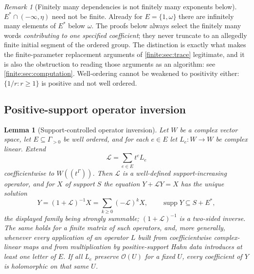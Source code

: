 \documentclass[11pt,letterpaper]{article}
\newtheorem{lemma}[theorem]{Lemma}
\theoremstyle{definition}
\theoremstyle{remark}
\newtheorem{remark}[theorem]{Remark}
\newcommand{\OO}{\mathcal O}
\DeclareMathOperator{\supp}{supp}
\numberwithin{equation}{section}
\begin{document}
\begin{remark}[Finitely many dependencies is not finitely many exponents below]
\label{finite:rem:truncation}
$E^*\cap(-\infty,\eta)$ need not be finite. Already for $E=\{1,\omega\}$ there are infinitely many elements of $E^*$ below $\omega$. The proofs below always select the finitely many words \emph{contributing to one specified coefficient}; they never truncate to an allegedly finite initial segment of the ordered group. The distinction is exactly what makes the finite-parameter replacement arguments of \cref{finite:sec:trace} legitimate, and it is also the obstruction to reading those arguments as an algorithm: see \cref{finite:sec:computation}. Well-ordering cannot be weakened to positivity either: $\{1/r:r\geq1\}$ is positive and not well ordered.
\end{remark}

\subsection{Positive-support operator inversion}
\label{finite:sec:neumann}

\begin{lemma}[Support-controlled operator inversion]
\label{finite:lem:operator}
Let $W$ be a complex vector space, let $E\subseteq\Gamma_{>0}$ be well ordered, and for each $e\in E$ let $L_e:W\to W$ be complex linear. Extend
\[
 \mathcal L=\sum_{e\in E}t^e L_e
\]
coefficientwise to $W((t^\Gamma))$. Then $\mathcal L$ is a well-defined support-increasing operator, and for $X$ of support $S$ the equation $Y+\mathcal LY=X$ has the unique solution
\begin{equation}\label{finite:eq:neumann}
 Y=(1+\mathcal L)^{-1}X=\sum_{k\geq0}(-\mathcal L)^kX,
 \qquad \supp Y\subseteq S+E^*,
\end{equation}
the displayed family being strongly summable; $(1+\mathcal L)^{-1}$ is a two-sided inverse. The same holds for a finite matrix of such operators, and, more generally, whenever every application of an operator $L$ built from coefficientwise complex-linear maps and from multiplication by positive-support Hahn data introduces at least one letter of $E$. If all $L_e$ preserve $\OO(U)$ for a fixed $U$, every coefficient of $Y$ is holomorphic on that same $U$.
\end{lemma}
\end{document}
